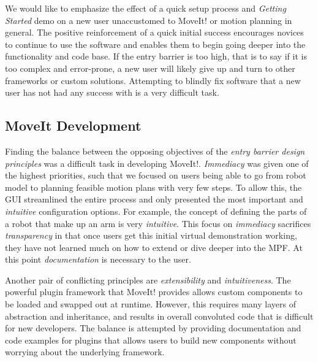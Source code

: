 \documentclass[10pt,journal,compsoc]{joser1}
\begin{document}
{We would like to emphasize the effect of a quick setup process and
\textit{Getting Started} demo on a new user unaccustomed to MoveIt! or motion
planning in general. The positive reinforcement of a quick initial success
encourages novices to continue to use the software and enables them to begin
going deeper into the functionality and code base. If the entry barrier is too
high, that is to say if it is too complex and error-prone, a new user will
likely give up and turn to other frameworks or custom solutions. Attempting to
blindly fix software that a new user has not had any success with is a very
difficult task.

\subsection{MoveIt Development}
\label{sec::moveit_development}

Finding the balance between the opposing objectives of the \textit{entry barrier design principles} was a difficult task in developing MoveIt!. \textit{Immediacy} was given one of the highest priorities, such that we focused on users being able to go from robot model to planning feasible motion plans with very few steps. To allow this, the GUI streamlined the entire process and only presented the most important and \textit{intuitive} configuration options. For example, the concept of defining the parts of a robot that make up an arm is very \textit{intuitive}. This focus on \textit{immediacy} sacrifices \textit{transparency} in that once users get this initial virtual demonstration working, they have not learned much on how to extend or dive deeper into the MPF. At this point \textit{documentation} is necessary to the user. 

Another pair of conflicting principles are \textit{extensibility} and \textit{intuitiveness}. The powerful plugin framework that MoveIt! provides allows custom components to be loaded and swapped out at runtime. However, this requires many layers of abstraction and inheritance, and results in overall convoluted code that is difficult for new developers. The balance is attempted by providing documentation and code examples for plugins that allows users to build new components without worrying about the underlying framework.

}
\end{document}
